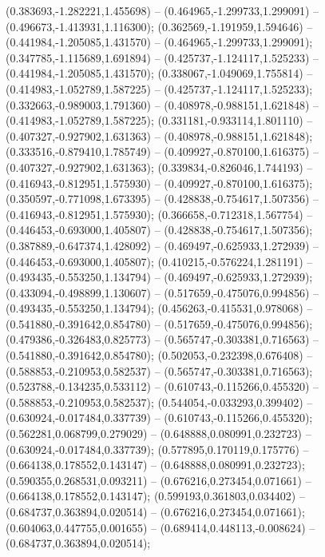  (0.383693,-1.282221,1.455698) -- (0.464965,-1.299733,1.299091) -- (0.496673,-1.413931,1.116300);
 (0.362569,-1.191959,1.594646) -- (0.441984,-1.205085,1.431570) -- (0.464965,-1.299733,1.299091);
 (0.347785,-1.115689,1.691894) -- (0.425737,-1.124117,1.525233) -- (0.441984,-1.205085,1.431570);
 (0.338067,-1.049069,1.755814) -- (0.414983,-1.052789,1.587225) -- (0.425737,-1.124117,1.525233);
 (0.332663,-0.989003,1.791360) -- (0.408978,-0.988151,1.621848) -- (0.414983,-1.052789,1.587225);
 (0.331181,-0.933114,1.801110) -- (0.407327,-0.927902,1.631363) -- (0.408978,-0.988151,1.621848);
 (0.333516,-0.879410,1.785749) -- (0.409927,-0.870100,1.616375) -- (0.407327,-0.927902,1.631363);
 (0.339834,-0.826046,1.744193) -- (0.416943,-0.812951,1.575930) -- (0.409927,-0.870100,1.616375);
 (0.350597,-0.771098,1.673395) -- (0.428838,-0.754617,1.507356) -- (0.416943,-0.812951,1.575930);
 (0.366658,-0.712318,1.567754) -- (0.446453,-0.693000,1.405807) -- (0.428838,-0.754617,1.507356);
 (0.387889,-0.647374,1.428092) -- (0.469497,-0.625933,1.272939) -- (0.446453,-0.693000,1.405807);
 (0.410215,-0.576224,1.281191) -- (0.493435,-0.553250,1.134794) -- (0.469497,-0.625933,1.272939);
 (0.433094,-0.498899,1.130607) -- (0.517659,-0.475076,0.994856) -- (0.493435,-0.553250,1.134794);
 (0.456263,-0.415531,0.978068) -- (0.541880,-0.391642,0.854780) -- (0.517659,-0.475076,0.994856);
 (0.479386,-0.326483,0.825773) -- (0.565747,-0.303381,0.716563) -- (0.541880,-0.391642,0.854780);
 (0.502053,-0.232398,0.676408) -- (0.588853,-0.210953,0.582537) -- (0.565747,-0.303381,0.716563);
 (0.523788,-0.134235,0.533112) -- (0.610743,-0.115266,0.455320) -- (0.588853,-0.210953,0.582537);
 (0.544054,-0.033293,0.399402) -- (0.630924,-0.017484,0.337739) -- (0.610743,-0.115266,0.455320);
 (0.562281,0.068799,0.279029) -- (0.648888,0.080991,0.232723) -- (0.630924,-0.017484,0.337739);
 (0.577895,0.170119,0.175776) -- (0.664138,0.178552,0.143147) -- (0.648888,0.080991,0.232723);
 (0.590355,0.268531,0.093211) -- (0.676216,0.273454,0.071661) -- (0.664138,0.178552,0.143147);
 (0.599193,0.361803,0.034402) -- (0.684737,0.363894,0.020514) -- (0.676216,0.273454,0.071661);
 (0.604063,0.447755,0.001655) -- (0.689414,0.448113,-0.008624) -- (0.684737,0.363894,0.020514);
